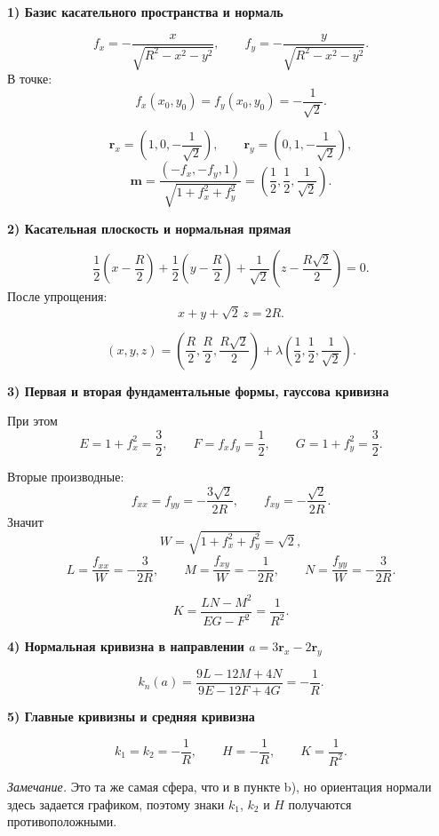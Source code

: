 \documentclass[12pt,a4paper]{article}
\begin{document}
\textbf{1) Базис касательного пространства и нормаль}

\[
f_x=-\frac{x}{\sqrt{R^2-x^2-y^2}},\qquad
f_y=-\frac{y}{\sqrt{R^2-x^2-y^2}}.
\]
В точке:
\[
f_x(x_0,y_0)=f_y(x_0,y_0)=-\frac1{\sqrt2}.
\]

\[
\mathbf r_x=\left(1,0,-\frac1{\sqrt2}\right),\qquad
\mathbf r_y=\left(0,1,-\frac1{\sqrt2}\right),
\]
\[
\mathbf m=\frac{(-f_x,-f_y,1)}{\sqrt{1+f_x^2+f_y^2}}
=\left(\frac12,\frac12,\frac1{\sqrt2}\right).
\]

\textbf{2) Касательная плоскость и нормальная прямая}

\[
\frac12\left(x-\frac R2\right)+\frac12\left(y-\frac R2\right)+\frac1{\sqrt2}\left(z-\frac{R\sqrt2}{2}\right)=0.
\]
После упрощения:
\[
x+y+\sqrt2\,z=2R.
\]

\[
(x,y,z)=\left(\frac R2,\frac R2,\frac{R\sqrt2}{2}\right)
+\lambda\left(\frac12,\frac12,\frac1{\sqrt2}\right).
\]

\textbf{3) Первая и вторая фундаментальные формы, гауссова кривизна}

При этом
\[
E=1+f_x^2=\frac32,\qquad
F=f_xf_y=\frac12,\qquad
G=1+f_y^2=\frac32.
\]

Вторые производные:
\[
f_{xx}=f_{yy}=-\frac{3\sqrt2}{2R},\qquad
f_{xy}=-\frac{\sqrt2}{2R}.
\]
Значит
\[
W=\sqrt{1+f_x^2+f_y^2}=\sqrt2,
\]
\[
L=\frac{f_{xx}}{W}=-\frac{3}{2R},\qquad
M=\frac{f_{xy}}{W}=-\frac{1}{2R},\qquad
N=\frac{f_{yy}}{W}=-\frac{3}{2R}.
\]

\[
K=\frac{LN-M^2}{EG-F^2}=\frac{1}{R^2}.
\]

\textbf{4) Нормальная кривизна в направлении $a=3\mathbf r_x-2\mathbf r_y$}

\[
k_n(a)=\frac{9L-12M+4N}{9E-12F+4G}
=-\frac1R.
\]

\textbf{5) Главные кривизны и средняя кривизна}

\[
k_1=k_2=-\frac1R,\qquad H=-\frac1R,\qquad K=\frac1{R^2}.
\]

\textit{Замечание.} Это та же самая сфера, что и в пункте b), но ориентация нормали здесь задается графиком, поэтому знаки $k_1$, $k_2$ и $H$ получаются противоположными.
\end{document}
